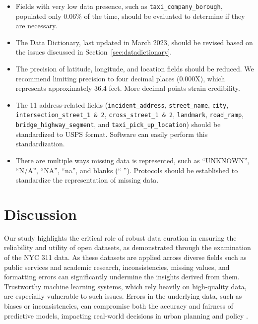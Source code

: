 \documentclass[linenumber]{jdsart}
\begin{document}
\begin{itemize}
    \item Fields with very low data presence, such as 
    \texttt{taxi\_company\_borough}, populated only 0.06\% of the time, 
    should be evaluated to determine if they are necessary.

    \item The Data Dictionary, last updated in March 2023, should be 
    revised based on the issues discussed in Section~\ref{sec:datadictionary}.

    \item The precision of latitude, longitude, and location fields 
    should be reduced. We recommend limiting precision to four 
    decimal places (0.000X), which represents approximately 36.4 feet. 
    More decimal points strain credibility.

    \item The 11 address-related fields (\texttt{incident\_address}, 
    \texttt{street\_name}, \texttt{city}, \texttt{intersection\_street\_1 \& 2}, 
    \texttt{cross\_street\_1 \& 2}, \texttt{landmark}, \texttt{road\_ramp}, 
    \texttt{bridge\_highway\_segment}, and \texttt{taxi\_pick\_up\_location}) 
    should be standardized to USPS format. Software can easily 
    perform this standardization.

    \item There are multiple ways missing data is represented, such as 
    ``UNKNOWN'', ``N/A'', ``NA'', ``na'', and blanks (`` ''). Protocols 
    should be established to standardize the representation of missing data.
\end{itemize}

\section{Discussion} \label{sec:discussion}

Our study highlights the critical role of robust data curation in
ensuring the reliability and utility of open datasets, as demonstrated
through the examination of the NYC 311 data. As these datasets are
applied across diverse fields such as public services and academic
research, inconsistencies, missing values, and formatting errors can
significantly undermine the insights derived from them. Trustworthy
machine learning systems, which rely heavily on high-quality data, are
especially vulnerable to such issues. Errors in the underlying data,
such as biases or inconsistencies, can compromise both the accuracy
and fairness of predictive models, impacting real-world decisions in
urban planning and policy \citep{rahm2000data, geiger2020garbage}.
\end{document}
